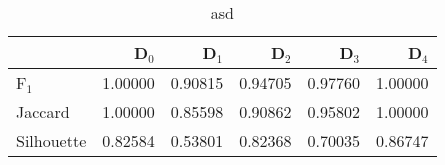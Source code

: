 \begin{table}
\centering
\caption{asd}
\label{tab:s1-orig-pivotbi-single}
\begin{tabular}{lrrrrr}
\toprule
{} &   D$_0$ &   D$_1$ &   D$_2$ &   D$_3$ &   D$_4$ \\
\midrule
F$_1$      & 1.00000 & 0.90815 & 0.94705 & 0.97760 & 1.00000 \\
Jaccard    & 1.00000 & 0.85598 & 0.90862 & 0.95802 & 1.00000 \\
Silhouette & 0.82584 & 0.53801 & 0.82368 & 0.70035 & 0.86747 \\
\bottomrule
\end{tabular}
\end{table}
